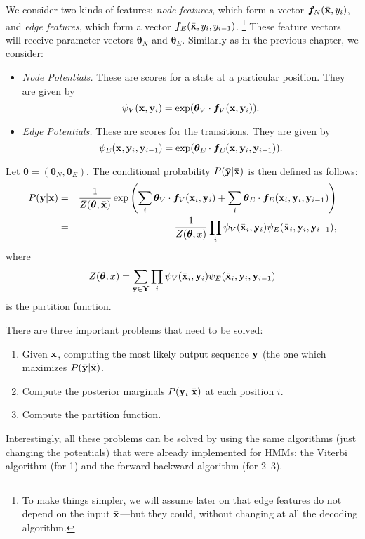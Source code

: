 We consider two kinds of features: \emph{node features}, which form a vector $\boldsymbol{f}_N(\bar{\mathbf{x}},{y}_i)$, 
and \emph{edge features}, which form a vector $\boldsymbol{f}_E(\bar{\mathbf{x}},{y}_i,{y}_{i-1})$.%
\footnote{To make things simpler, we will assume later on that edge features do not depend on the input $\bar{\mathbf{x}}$---but they could, without 
changing at all the decoding algorithm.} %
These feature vectors will receive parameter vectors $\boldsymbol{\theta}_N$ and  $\boldsymbol{\theta}_E$. 
Similarly as in the previous chapter, we consider:
\begin{itemize}
\item\emph{Node Potentials.} These are scores for a state at a particular position. 
 They are given by 
 \begin{equation}\label{dis_node_potentials}
 \psi_V(\bar{\mathbf{x}},\mathbf{y}_i) = \exp(\boldsymbol{\theta}_V \cdot \boldsymbol{f}_V(\bar{\mathbf{x}},\mathbf{y}_i)).
 \end{equation}
\item\emph{Edge Potentials.} These are scores for the transitions. They are given by 
 \begin{equation}\label{dis_edge_potentials}
\psi_E(\bar{\mathbf{x}},\mathbf{y}_i,\mathbf{y}_{i-1}) = \exp(\boldsymbol{\theta}_E \cdot \boldsymbol{f}_E(\bar{\mathbf{x}},\mathbf{y}_i,\mathbf{y}_{i-1})). 
 \end{equation}
\end{itemize}

Let $\boldsymbol{\theta} = (\boldsymbol{\theta}_N, \boldsymbol{\theta}_E)$. 
The conditional probability $P(\bar{\mathbf{y}}|\bar{\mathbf{x}})$ is then defined as follows: 
\begin{eqnarray}
P(\bar{\mathbf{y}}|\bar{\mathbf{x}}) &=& \frac{1}{Z(\boldsymbol{\theta},\bar{\mathbf{x}})}\exp\left(\sum_i \boldsymbol{\theta}_V \cdot \boldsymbol{f}_V(\bar{\mathbf{x}}_i,\mathbf{y}_i) + 
\sum_i\boldsymbol{\theta}_E \cdot
\boldsymbol{f}_E(\bar{\mathbf{x}}_i,\mathbf{y}_i,\mathbf{y}_{i-1})\right) \label{eq:disc_formula}\\
&=& \frac{1}{Z(\boldsymbol{\theta},x)} \prod_i\psi_V(\bar{\mathbf{x}}_i,\mathbf{y}_i) \psi_E(\bar{\mathbf{x}}_i,\mathbf{y}_i,\mathbf{y}_{i-1}),
\end{eqnarray}
where
\begin{eqnarray}
Z(\boldsymbol{\theta},x) = \sum_{\mathbf{y} \in \mathbf{Y}} \prod_i \psi_V(\bar{\mathbf{x}}_i,\mathbf{y}_i) \psi_E(\bar{\mathbf{x}}_i,\mathbf{y}_i,\mathbf{y}_{i-1})
\end{eqnarray}
is the partition function. 

There are three important problems that need to be solved: 
\begin{enumerate}
\item Given $\bar{\mathbf{x}}$, computing the most likely output sequence $\bar{\mathbf{y}}$ (the one which maximizes $P(\bar{\mathbf{y}}|\bar{\mathbf{x}})$. 
\item Compute the posterior marginals $P(\mathbf{y}_i|\bar{\mathbf{x}})$ at each position $i$.
\item Compute the partition function. 
\end{enumerate}
Interestingly, all these problems can be solved by using the same
algorithms (just changing the potentials) that were 
already implemented for HMMs: the Viterbi algorithm (for 1) and the forward-backward algorithm (for 2--3).








